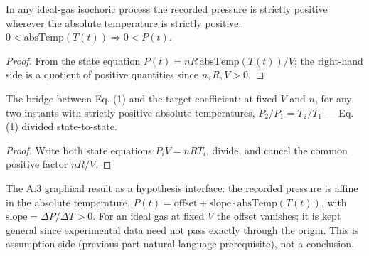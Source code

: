 \begin{lemma}
\label{lem:IPhO2026Problems_problem_IPhO_2026_4_A_5:IsIdealGasLaw_pressure_pos_of_temp_pos}
In any ideal-gas isochoric process the recorded pressure is strictly
positive wherever the absolute temperature is strictly positive:
$0 < \mathrm{absTemp}(T(t)) \Rightarrow 0 < P(t)$.
\end{lemma}
\begin{proof}
From the state equation $P(t) = n R\, \mathrm{absTemp}(T(t))/V$; the
right-hand side is a quotient of positive quantities since
$n, R, V > 0$.
\end{proof}

\begin{lemma}
\label{lem:IPhO2026Problems_problem_IPhO_2026_4_A_5:IsIdealGasLaw_pressure_ratio_eq_temp_ratio}
The bridge between Eq. (1) and the target coefficient: at fixed $V$ and
$n$, for any two instants with strictly positive absolute temperatures,
$P_2/P_1 = T_2/T_1$ --- Eq. (1) divided state-to-state.
\end{lemma}
\begin{proof}
Write both state equations $P_i V = n R T_i$, divide, and cancel the
common positive factor $nR/V$.
\end{proof}

\begin{definition}
\label{def:IPhO2026Problems_problem_IPhO_2026_4_A_5:IsIsochoricLinear}
The A.3 graphical result as a hypothesis interface: the recorded pressure
is affine in the absolute temperature,
$P(t) = \mathrm{offset} + \mathrm{slope}\cdot\mathrm{absTemp}(T(t))$,
with $\mathrm{slope} = \Delta P/\Delta T > 0$.  For an ideal gas at fixed
$V$ the offset vanishes; it is kept general since experimental data need
not pass exactly through the origin.  This is assumption-side
(previous-part natural-language prerequisite), not a conclusion.
\end{definition}

